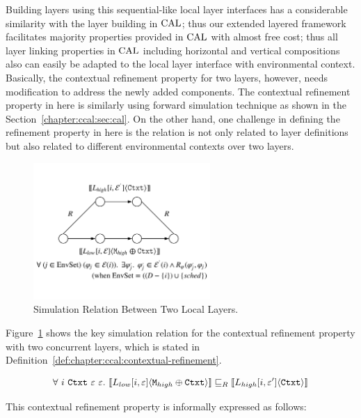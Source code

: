 Building layers using this sequential-like local layer interfaces has a considerable similarity with 
the layer building in $\mathrm{CAL}$; thus 
our extended layered framework facilitates
majority properties provided in $\mathrm{CAL}$ with almost free cost;
thus all layer linking properties in $\mathrm{CAL}$ including horizontal and vertical compositions also can 
easily be adapted to the local layer interface with environmental context.
Basically, the contextual refinement property for two layers, however, needs modification to address the newly added components. 
The contextual refinement property in here is similarly using forward simulation technique as shown in the 
Section~\ref{chapter:ccal:sec:cal}.
On the other hand, one challenge in defining the refinement property in here is the relation is not only related to layer definitions but also related to different environmental contexts over two layers. 
\begin{figure}
\begin{center}
\includegraphics[width=0.6\textwidth]{figs/ccal/locallayerrefinement}
\end{center}
\caption{Simulation Relation Between Two Local Layers.}
\label{fig:chapter:ccal:refinement-between-two-layers}
\end{figure}
Figure~\ref{fig:chapter:ccal:refinement-between-two-layers} shows the key simulation relation for 
the contextual refinement property with two concurrent layers, which is stated  in Definition~\ref{def:chapter:ccal:contextual-refinement}.
\begin{definition}
\label{def:chapter:ccal:contextual-refinement}
$$
\forall \ i\  \codeinmath{Ctxt} \ \oracle \ \oracle .\ \sem{L_{low}[i, \oracle]}{\codeinmath{M}_{high} \oplus \codeinmath{Ctxt}} \refines_R \sem{L_{high}[i, \oracle']}{\codeinmath{Ctxt}}
$$
\end{definition}
This contextual refinement property is informally expressed as follows:
